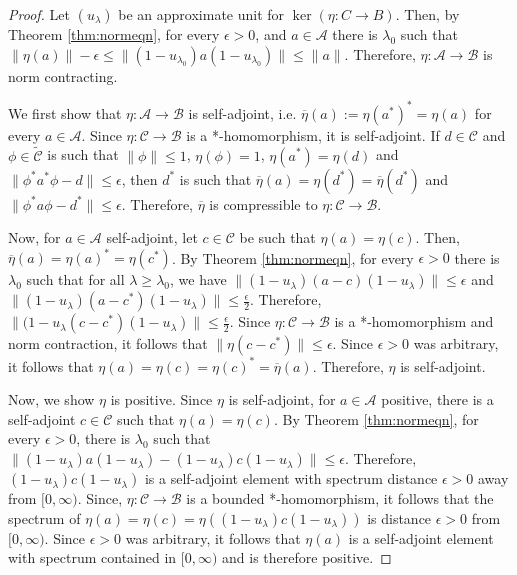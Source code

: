 \documentclass[a4paper, 12pt]{amsart}
\theoremstyle{definition}
\theoremstyle{remark}
\numberwithin{equation}{section}
\begin{document}
\begin{proof}
    Let $(u_{\lambda})$ be an approximate unit for $\ker(\eta:C\to B)$. Then, by Theorem \ref{thm:normeqn}, for every $\epsilon > 0$, and $a\in\mathcal{A}$ there is $\lambda_{0}$ such that $\|\eta(a)\| - \epsilon \leq \|(1-u_{\lambda_{0}})a(1-u_{\lambda_{0}})\|\leq \|a\|$. Therefore, $\eta:\mathcal{A}\to\mathcal{B}$ is norm contracting.

    We first show that $\eta:\mathcal{A}\to\mathcal{B}$ is self-adjoint, i.e. $\overline{\eta}(a) := \eta(a^{*})^{*} = \eta(a)$ for every $a\in \mathcal{A}$. Since $\eta:\mathcal{C}\to \mathcal{B}$ is a *-homomorphism, it is self-adjoint. If $d\in\mathcal{C}$ and $\phi\in \tilde{\mathcal{C}}$ is such that $\|\phi\|\leq 1$, $\eta(\phi) = 1$, $\eta(a^{*}) = \eta(d)$ and $\|\phi^{*} a^{*}\phi - d\|\leq \epsilon$, then $d^{*}$ is such that $\overline{\eta}(a) = \eta(d^{*}) = \overline{\eta}(d^{*})$ and $\|\phi^{*} a\phi - d^{*}\|\leq \epsilon.$ Therefore, $\overline{\eta}$ is compressible to $\eta:\mathcal{C}\to\mathcal{B}$.

    Now, for $a\in\mathcal{A}$ self-adjoint, let $c\in\mathcal{C}$ be such that $\eta(a) = \eta(c)$. Then, $\overline{\eta}(a) = \eta(a)^{*} = \eta(c^{*})$. By Theorem \ref{thm:normeqn}, for every $\epsilon > 0$ there is $\lambda_{0}$ such that for all $\lambda\geq \lambda_{0}$, we have $\|(1- u_{\lambda}) (a - c)(1-u_{\lambda})\|\leq \epsilon$ and $\|(1- u_{\lambda}) (a - c^{*})(1-u_{\lambda})\|\leq \frac{\epsilon}{2}$. Therefore, $\|(1- u_{\lambda} (c - c^{*})(1-u_{\lambda})\|\leq \frac{\epsilon}{2}$. Since $\eta:\mathcal{C}\to\mathcal{B}$ is a *-homomorphism and norm contraction, it follows that $\|\eta(c - c^{*})\|\leq \epsilon$. Since $\epsilon > 0$ was arbitrary, it follows that $\eta(a) = \eta(c) = \eta(c)^{*} = \overline{\eta}(a)$. Therefore, $\eta$ is self-adjoint.

    Now, we show $\eta$ is positive. Since $\eta$ is self-adjoint, for $a\in\mathcal{A}$ positive, there is a self-adjoint $c\in\mathcal{C}$ such that $\eta(a) = \eta(c)$. By Theorem \ref{thm:normeqn}, for every $\epsilon > 0$, there is $\lambda_{0}$ such that $\|(1-u_{\lambda})a(1- u_{\lambda}) - (1-u_{\lambda})c(1- u_{\lambda})\|\leq \epsilon$. Therefore, $(1-u_{\lambda})c(1- u_{\lambda})$ is a self-adjoint element with spectrum distance $\epsilon > 0$ away from $[0,\infty)$. Since, $\eta:\mathcal{C}\to\mathcal{B}$ is a bounded *-homomorphism, it follows that the spectrum of  $\eta(a) = \eta(c) = \eta((1-u_{\lambda})c(1- u_{\lambda}))$ is distance $\epsilon > 0$ from $[0,\infty)$. Since $\epsilon > 0$ was arbitrary, it follows that $\eta(a)$ is a self-adjoint element with spectrum contained in $[0,\infty)$ and is therefore positive.


\end{proof}
\end{document}
